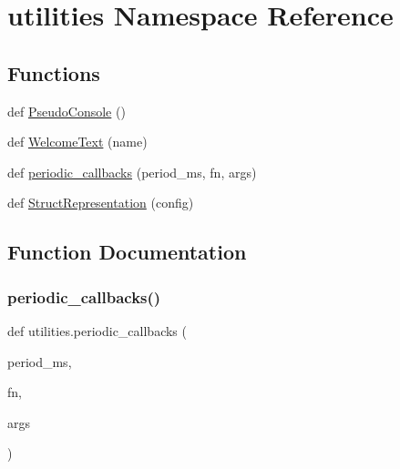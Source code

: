 \hypertarget{namespaceutilities}{}\section{utilities Namespace Reference}
\label{namespaceutilities}
\subsection*{Functions}
\begin{DoxyCompactItemize}
\item 
def \hyperlink{namespaceutilities_a85150e8e264f76b149785770210a7f1a}{Pseudo\+Console} ()
\item 
def \hyperlink{namespaceutilities_a7c64a494f834c091373f2bb148dc2e8c}{Welcome\+Text} (name)
\item 
def \hyperlink{namespaceutilities_a35dce39ce5efc1ca1a29b30ffc373bd0}{periodic\+\_\+callbacks} (period\+\_\+ms, fn, args)
\item 
def \hyperlink{namespaceutilities_aa2added918da29f1fa28d3ea24d570d9}{Struct\+Representation} (config)
\end{DoxyCompactItemize}


\subsection{Function Documentation}
\mbox{\label{namespaceutilities_a35dce39ce5efc1ca1a29b30ffc373bd0}} 
\subsubsection{\texorpdfstring{periodic\+\_\+callbacks()}{periodic\_callbacks()}}
{\footnotesize\ttfamily def utilities.\+periodic\+\_\+callbacks (\begin{DoxyParamCaption}\item[{}]{period\+\_\+ms,  }\item[{}]{fn,  }\item[{}]{args }\end{DoxyParamCaption})}

\mbox{\label{namespaceutilities_a85150e8e264f76b149785770210a7f1a}} 

